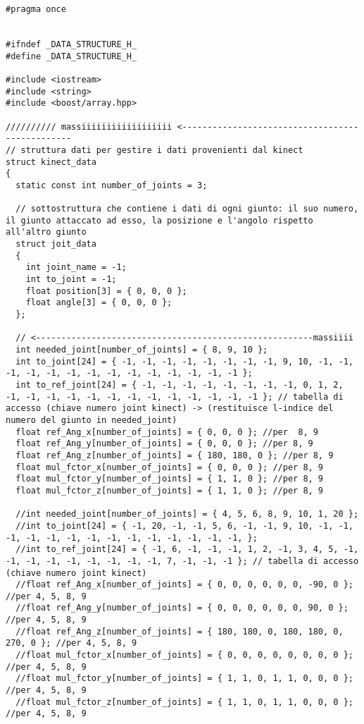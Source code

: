 \documentclass[10pt,a4paper]{article}
\begin{document}
\begin{lstlisting}[style=mycpp, caption=librerie usate, captionpos=b]
#pragma once


#ifndef _DATA_STRUCTURE_H_
#define _DATA_STRUCTURE_H_

#include <iostream>
#include <string>
#include <boost/array.hpp>

////////// massiiiiiiiiiiiiiiiiii <------------------------------------------------
// struttura dati per gestire i dati provenienti dal kinect
struct kinect_data
{
  static const int number_of_joints = 3;

  // sottostruttura che contiene i dati di ogni giunto: il suo numero, il giunto attaccato ad esso, la posizione e l'angolo rispetto all'altro giunto
  struct joit_data
  {
    int joint_name = -1;
    int to_joint = -1;
    float position[3] = { 0, 0, 0 };
    float angle[3] = { 0, 0, 0 };
  };

  // <-------------------------------------------------------massiiii
  int needed_joint[number_of_joints] = { 8, 9, 10 };
  int to_joint[24] = { -1, -1, -1, -1, -1, -1, -1, -1, 9, 10, -1, -1, -1, -1, -1, -1, -1, -1, -1, -1, -1, -1, -1, -1 };
  int to_ref_joint[24] = { -1, -1, -1, -1, -1, -1, -1, -1, 0, 1, 2, -1, -1, -1, -1, -1, -1, -1, -1, -1, -1, -1, -1, -1 }; // tabella di accesso (chiave numero joint kinect) -> (restituisce l-indice del numero del giunto in needed_joint)    
  float ref_Ang_x[number_of_joints] = { 0, 0, 0 }; //per  8, 9
  float ref_Ang_y[number_of_joints] = { 0, 0, 0 }; //per 8, 9
  float ref_Ang_z[number_of_joints] = { 180, 180, 0 }; //per 8, 9
  float mul_fctor_x[number_of_joints] = { 0, 0, 0 }; //per 8, 9
  float mul_fctor_y[number_of_joints] = { 1, 1, 0 }; //per 8, 9
  float mul_fctor_z[number_of_joints] = { 1, 1, 0 }; //per 8, 9

  //int needed_joint[number_of_joints] = { 4, 5, 6, 8, 9, 10, 1, 20 };
  //int to_joint[24] = { -1, 20, -1, -1, 5, 6, -1, -1, 9, 10, -1, -1, -1, -1, -1, -1, -1, -1, -1, -1, -1, -1, -1, -1, };
  //int to_ref_joint[24] = { -1, 6, -1, -1, -1, 1, 2, -1, 3, 4, 5, -1, -1, -1, -1, -1, -1, -1, -1, -1, 7, -1, -1, -1 }; // tabella di accesso (chiave numero joint kinect)  
  //float ref_Ang_x[number_of_joints] = { 0, 0, 0, 0, 0, 0, -90, 0 }; //per 4, 5, 8, 9
  //float ref_Ang_y[number_of_joints] = { 0, 0, 0, 0, 0, 0, 90, 0 }; //per 4, 5, 8, 9
  //float ref_Ang_z[number_of_joints] = { 180, 180, 0, 180, 180, 0, 270, 0 }; //per 4, 5, 8, 9
  //float mul_fctor_x[number_of_joints] = { 0, 0, 0, 0, 0, 0, 0, 0 }; //per 4, 5, 8, 9
  //float mul_fctor_y[number_of_joints] = { 1, 1, 0, 1, 1, 0, 0, 0 }; //per 4, 5, 8, 9
  //float mul_fctor_z[number_of_joints] = { 1, 1, 0, 1, 1, 0, 0, 0 }; //per 4, 5, 8, 9


\end{lstlisting}
\end{document}
